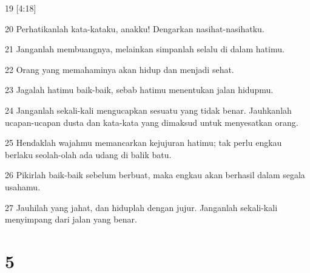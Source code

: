 \par 19 [4:18]
\par 20 Perhatikanlah kata-kataku, anakku! Dengarkan nasihat-nasihatku.
\par 21 Janganlah membuangnya, melainkan simpanlah selalu di dalam hatimu.
\par 22 Orang yang memahaminya akan hidup dan menjadi sehat.
\par 23 Jagalah hatimu baik-baik, sebab hatimu menentukan jalan hidupmu.
\par 24 Janganlah sekali-kali mengucapkan sesuatu yang tidak benar. Jauhkanlah ucapan-ucapan dusta dan kata-kata yang dimaksud untuk menyesatkan orang.
\par 25 Hendaklah wajahmu memancarkan kejujuran hatimu; tak perlu engkau berlaku seolah-olah ada udang di balik batu.
\par 26 Pikirlah baik-baik sebelum berbuat, maka engkau akan berhasil dalam segala usahamu.
\par 27 Jauhilah yang jahat, dan hiduplah dengan jujur. Janganlah sekali-kali menyimpang dari jalan yang benar.

\chapter{5}

